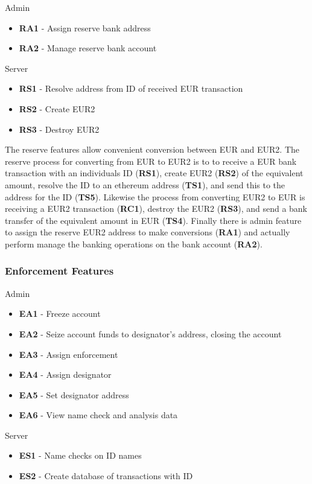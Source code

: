 \documentclass[12pt]{article} %
\begin{document}
{{Admin
\begin{itemize}
	\item \textbf{RA1} - Assign reserve bank address
	\item \textbf{RA2} - Manage reserve bank account
\end{itemize}

Server
\begin{itemize}
	\item \textbf{RS1} - Resolve address from ID of received EUR transaction
	\item \textbf{RS2} - Create EUR2
	\item \textbf{RS3} - Destroy EUR2
\end{itemize}

The reserve features allow convenient conversion between EUR and EUR2. The reserve process for converting from EUR to EUR2 is to to receive a EUR bank transaction with an individuals ID (\textbf{RS1}), create EUR2 (\textbf{RS2}) of the equivalent amount, resolve the ID to an ethereum address (\textbf{TS1}), and send this to the address for the ID (\textbf{TS5}).  Likewise the process from converting EUR2 to EUR is receiving a EUR2 transaction (\textbf{RC1}), destroy the EUR2 (\textbf{RS3}), and send a bank transfer of the equivalent amount in EUR (\textbf{TS4}). Finally there is admin feature to assign the reserve EUR2 address to make conversions (\textbf{RA1}) and actually perform manage the banking operations on the bank account (\textbf{RA2}).

\subsubsection{Enforcement Features} \label{sssec:3.3:enforcement}

Admin
\begin{itemize}
	\item \textbf{EA1} - Freeze account
	\item \textbf{EA2} - Seize account funds to designator's address, closing the account
	\item \textbf{EA3} - Assign enforcement
	\item \textbf{EA4} - Assign designator
	\item \textbf{EA5} - Set designator address
	\item \textbf{EA6} - View name check and analysis data
\end{itemize}

Server
\begin{itemize}
	\item \textbf{ES1} - Name checks on ID names
	\item \textbf{ES2} - Create database of transactions with ID
\end{itemize}

}}
\end{document}
